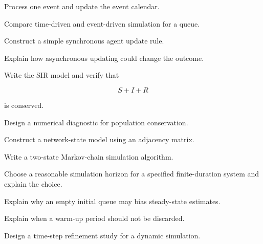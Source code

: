 \begin{exercise}[3]
Process one event and update the event calendar.
\end{exercise}

\begin{exercise}[3]
Compare time-driven and event-driven simulation for a queue.
\end{exercise}

\begin{exercise}[3]
Construct a simple synchronous agent update rule.
\end{exercise}

\begin{exercise}[3]
Explain how asynchronous updating could change the outcome.
\end{exercise}

\begin{exercise}[2]
Write the SIR model and verify that

\[
S+I+R
\]

is conserved.
\end{exercise}

\begin{exercise}[3]
Design a numerical diagnostic for population conservation.
\end{exercise}

\begin{exercise}[3]
Construct a network-state model using an adjacency matrix.
\end{exercise}

\begin{exercise}[3]
Write a two-state Markov-chain simulation algorithm.
\end{exercise}

\begin{exercise}[2]
Choose a reasonable simulation horizon for a specified finite-duration
system and explain the choice.
\end{exercise}

\begin{exercise}[3]
Explain why an empty initial queue may bias steady-state estimates.
\end{exercise}

\begin{exercise}[3]
Explain when a warm-up period should not be discarded.
\end{exercise}

\begin{exercise}[3]
Design a time-step refinement study for a dynamic simulation.
\end{exercise}

